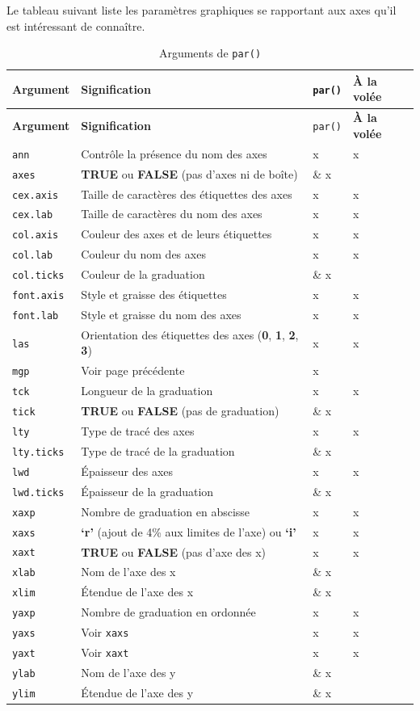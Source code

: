 \documentclass[]{article}
\begin{document}
Le tableau suivant liste les paramètres graphiques se rapportant aux axes qu'il est intéressant de connaître.

\begin{longtable}[]{@{}llll@{}}
\caption{Arguments de \texttt{par()}}\tabularnewline
\toprule
\textbf{Argument} & \textbf{Signification} & \texttt{par()} & \textbf{À la volée}\tabularnewline
\midrule
\endfirsthead
\toprule
\textbf{Argument} & \textbf{Signification} & \texttt{par()} & \textbf{À la volée}\tabularnewline
\midrule
\endhead
\texttt{ann} & Contrôle la présence du nom des axes & x & x\tabularnewline
\texttt{axes} & \textbf{TRUE} ou \textbf{FALSE} (pas d'axes ni de boîte) & \& x &\tabularnewline
\texttt{cex.axis} & Taille de caractères des étiquettes des axes & x & x\tabularnewline
\texttt{cex.lab} & Taille de caractères du nom des axes & x & x\tabularnewline
\texttt{col.axis} & Couleur des axes et de leurs étiquettes & x & x\tabularnewline
\texttt{col.lab} & Couleur du nom des axes & x & x\tabularnewline
\texttt{col.ticks} & Couleur de la graduation & \& x &\tabularnewline
\texttt{font.axis} & Style et graisse des étiquettes & x & x\tabularnewline
\texttt{font.lab} & Style et graisse du nom des axes & x & x\tabularnewline
\texttt{las} & Orientation des étiquettes des axes (\textbf{0}, \textbf{1}, \textbf{2}, \textbf{3}) & x & x\tabularnewline
\texttt{mgp} & Voir page précédente & x &\tabularnewline
\texttt{tck} & Longueur de la graduation & x & x\tabularnewline
\texttt{tick} & \textbf{TRUE} ou \textbf{FALSE} (pas de graduation) & \& x &\tabularnewline
\texttt{lty} & Type de tracé des axes & x & x\tabularnewline
\texttt{lty.ticks} & Type de tracé de la graduation & \& x &\tabularnewline
\texttt{lwd} & Épaisseur des axes & x & x\tabularnewline
\texttt{lwd.ticks} & Épaisseur de la graduation & \& x &\tabularnewline
\texttt{xaxp} & Nombre de graduation en abscisse & x & x\tabularnewline
\texttt{xaxs} & \textbf{`r'} (ajout de 4\% aux limites de l'axe) ou \textbf{`i'} & x & x\tabularnewline
\texttt{xaxt} & \textbf{TRUE} ou \textbf{FALSE} (pas d'axe des x) & x & x\tabularnewline
\texttt{xlab} & Nom de l'axe des x & \& x &\tabularnewline
\texttt{xlim} & Étendue de l'axe des x & \& x &\tabularnewline
\texttt{yaxp} & Nombre de graduation en ordonnée & x & x\tabularnewline
\texttt{yaxs} & Voir \texttt{xaxs} & x & x\tabularnewline
\texttt{yaxt} & Voir \texttt{xaxt} & x & x\tabularnewline
\texttt{ylab} & Nom de l'axe des y & \& x &\tabularnewline
\texttt{ylim} & Étendue de l'axe des y & \& x &\tabularnewline
\bottomrule
\end{longtable}
\end{document}
